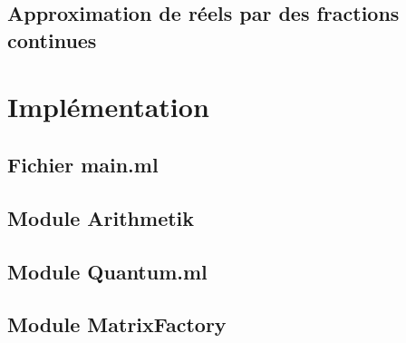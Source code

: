 \documentclass[a4paper,10pt]{article}
\begin{document}
\subsection{Approximation de réels par des fractions continues}

\appendix
\section{Implémentation}
\subsection{Fichier main.ml}
\subsection{Module Arithmetik}
\subsection{Module Quantum.ml}
\subsection{Module MatrixFactory}
\end{document}
